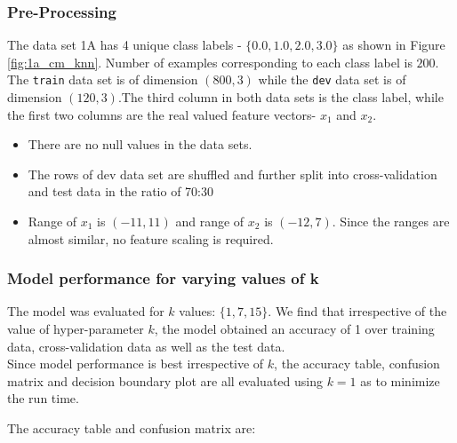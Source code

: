 \documentclass[11pt,a4paper]{article}
\newcommand{\noi}{\noindent}
\def\tt#1{\texttt{#1}}
\begin{document}
\subsubsection{Pre-Processing}

The data set 1A has 4 unique class labels - $\{0.0, 1.0, 2.0, 3.0\}$ as shown in Figure \ref{fig:1a_cm_knn}. Number of examples corresponding to each class label is $200$.
The \tt{train} data set is of dimension $(800,3)$ while the \tt{dev} data set is of dimension $(120,3)$.The third column in both data sets is the class label, while the first two columns are the real valued feature vectors- $x_{1}$ and $x_{2}$.
\begin{itemize}
    \itemsep0em
    \item There are no null values in the data sets. 
    \item The rows of dev data set are shuffled and further split into cross-validation and test data in the ratio of 70:30
    \item Range of $x_1$ is $(-11,11)$ and range of $x_2$ is $(-12,7)$. Since the ranges are almost similar, no feature scaling is required.  
\end{itemize}

\subsubsection{Model performance for varying values of k}
The model was evaluated for $k$ values: $\{1,7,15\}$. We find that irrespective of the value of hyper-parameter $k$, the model obtained an accuracy of 1 over training data, cross-validation data as well as the test data. \\

\noi
Since model performance is best irrespective of $k$, the accuracy table, confusion matrix and decision boundary plot are all evaluated using $k=1$ as to minimize the run time.

\noi
The accuracy table and confusion matrix are: 

\end{document}
